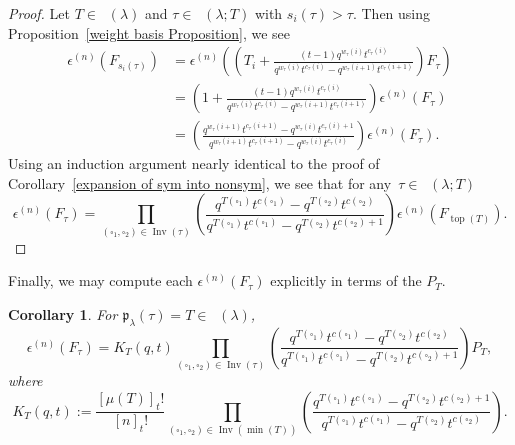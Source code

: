 \documentclass[pdftex]{sigma}
\numberwithin{equation}{section}
\newtheorem{Corollary}[Theorem]{Corollary}
\theoremstyle{definition}
\DeclareMathOperator{\PSYT}{\mathrm{PSYT}_{\geq 0}}
\DeclareMathOperator{\RSSYT}{\mathrm{RSSYT}_{\geq 0}}
\DeclareMathOperator{\Inv}{\mathrm{Inv}}
\DeclareMathOperator{\Top}{\mathrm{top}}
\DeclareMathOperator{\Min}{\mathrm{min}}
\begin{document}
\begin{proof}
 Let $T \in \RSSYT(\lambda)$ and $\tau \in \PSYT(\lambda;T)$ with $s_i(\tau) > \tau$.
 Then using Proposition~\ref{weight basis Proposition}, we see
 \begin{align*}
 \epsilon^{(n)}(F_{s_i(\tau)})& = \epsilon^{(n)}\left( \left(T_i +\frac{(t-1)q^{w_{\tau}(i)}t^{c_{\tau}(i)}}{q^{w_{\tau}(i)}t^{c_{\tau}(i)} - q^{w_{\tau}(i+1)}t^{c_{\tau}(i+1)}} \right)F_{\tau}\right) \\
 & = \left(1+ \frac{(t-1)q^{w_{\tau}(i)}t^{c_{\tau}(i)}}{q^{w_{\tau}(i)}t^{c_{\tau}(i)} - q^{w_{\tau}(i+1)}t^{c_{\tau}(i+1)}} \right) \epsilon^{(n)}(F_{\tau}) \\
 &= \left( \frac{q^{w_{\tau}(i+1)}t^{c_{\tau}(i+1)}- q^{w_{\tau}(i)}t^{c_{\tau}(i)+1}}{q^{w_{\tau}(i+1)}t^{c_{\tau}(i+1)} - q^{w_{\tau}(i)}t^{c_{\tau}(i)}} \right) \epsilon^{(n)}(F_{\tau}).
 \end{align*}
 Using an induction argument nearly identical to the proof of Corollary~\ref{expansion of sym into nonsym}, we see that for any~${\tau \in \PSYT(\lambda;T)}$
 \[
 \epsilon^{(n)}(F_{\tau}) = \prod_{(\square_1,\square_2) \in \Inv(\tau)} \left( \frac{q^{T(\square_1)}t^{c(\square_1)} - q^{T(\square_2)}t^{c(\square_2) }}{q^{T(\square_1)}t^{c(\square_1)} - q^{T(\square_2)}t^{c(\square_2) +1}} \right) \epsilon^{(n)}(F_{\Top(T)}).\tag*{\qed}
 \] \renewcommand{\qed}{}
\end{proof}

Finally, we may compute each $\epsilon^{(n)}(F_{\tau})$ explicitly in terms of the $P_{T}$.

\begin{Corollary}\label{symmetrization coefficients in general}
 For $\mathfrak{p}_{\lambda}(\tau) = T \in \RSSYT(\lambda)$,
 \[
 \epsilon^{(n)}(F_{\tau}) = K_{T}(q,t)\prod_{(\square_1,\square_2) \in \Inv(\tau)} \left( \frac{q^{T(\square_1)}t^{c(\square_1)} - q^{T(\square_2)}t^{c(\square_2) }}{q^{T(\square_1)}t^{c(\square_1)} - q^{T(\square_2)}t^{c(\square_2) +1}} \right) P_T,
 \]
 where
 \[
 K_T(q,t):= \frac{[\mu(T)]_{t}!}{[n]_{t}!} \prod_{(\square_1,\square_2) \in \Inv(\Min(T))} \left( \frac{q^{T(\square_1)}t^{c(\square_1)} - q^{T(\square_2)}t^{c(\square_2) +1 }}{q^{T(\square_1)}t^{c(\square_1)} - q^{T(\square_2)}t^{c(\square_2)}} \right).
 \]

\end{Corollary}
\end{document}
